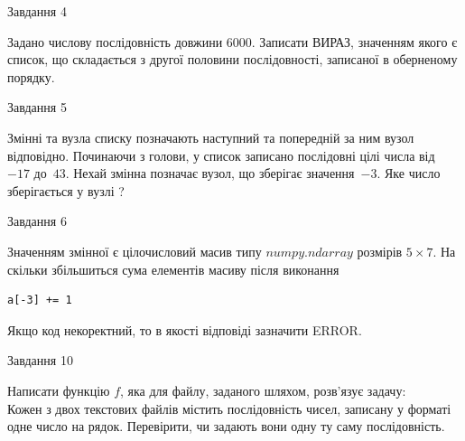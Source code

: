 \documentclass[12pt, ukrainian]{article}
\begin{document}
{\begin{minipage}[t]{8.0cm}
\begin{verbatim}
\end{verbatim}            

\end{minipage}


               
{\begin{center}Завдання {4}\end{center}}
\vspace{-4mm}

 Задано числову послідовність  довжини 6000. Записати ВИРАЗ, значенням якого є список, що складається з другої половини послідовності, записаної в оберненому порядку.\par

\vspace{10mm}
               
{\begin{center}Завдання {5}\end{center}}
\vspace{-4mm}
Змінні  та  вузла списку позначають наступний та попередній за ним вузол відповідно. Починаючи з голови, у список записано послідовні цілі числа від~$-17$ до~$43$. Нехай змінна  позначає вузол, що зберігає значення~$-3$.
Яке число зберігається у вузлі  ?\par

               
{\begin{center}Завдання {6}\end{center}}
\vspace{-4mm}
Значенням змінної  є цілочисловий масив типу $numpy.ndarray$ розмірів $5{\times}7$. На скільки збільшиться сума елементів масиву  після виконання
\begin{verbatim}
a[-3] += 1
\end{verbatim}


Якщо код некоректний, то в якості відповіді зазначити ERROR.\par

               
{\begin{center}Завдання {10}\end{center}}
\vspace{-4mm}

Написати функцію $f$, яка для файлу, заданого шляхом, розв’язує задачу:\\ Кожен з двох текстових файлів містить послідовність чисел, записану у форматі одне число на рядок.  Перевірити, чи задають вони одну ту саму послідовність.

}
\end{document}
